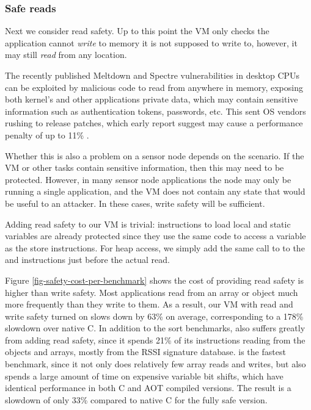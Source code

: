 \subsubsection{Safe reads}
Next we consider read safety. Up to this point the VM only checks the application cannot \emph{write} to memory it is not supposed to write to, however, it may still \emph{read} from any location.

The recently published Meltdown and Spectre vulnerabilities in desktop CPUs can be exploited by malicious code to read from anywhere in memory, exposing both kernel's and other applications private data, which may contain sensitive information such as authentication tokens, passwords, etc. This sent OS vendors rushing to release patches, which early report suggest may cause a performance penalty of up to 11\% \cite{Simakov:2018wp}.

Whether this is also a problem on a sensor node depends on the scenario. If the VM or other tasks contain sensitive information, then this may need to be protected. However, in many sensor node applications the node may only be running a single application, and the VM does not contain any state that would be useful to an attacker. In these cases, write safety will be sufficient.

Adding read safety to our VM is trivial: instructions to load local and static variables are already protected since they use the same code to access a variable as the store instructions. For heap access, we simply add the same call to  to the  and  instructions just before the actual read.

Figure \ref{fig-safety-cost-per-benchmark} shows the cost of providing read safety is higher than write safety. Most applications read from an array or object much more frequently than they write to them. As a result, our VM with read and write safety turned on slows down by 63\% on average, corresponding to a 178\% slowdown over native C. In addition to the sort benchmarks,  also suffers greatly from adding read safety, since it spends 21\% of its instructions reading from the objects and arrays, mostly from the RSSI signature database.  is the fastest benchmark, since it not only does relatively few array reads and writes, but also spends a large amount of time on expensive variable bit shifts, which have identical performance in both C and AOT compiled versions. The result is a slowdown of only 33\% compared to native C for the fully safe version.

